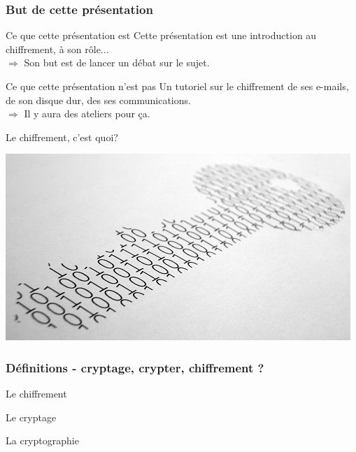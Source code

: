 \documentclass{beamer}
\begin{document}

\begin{frame}
\frametitle{But de cette présentation}

\begin{block}{Ce que cette présentation est}
Cette présentation est une introduction au chiffrement, à son rôle...
\\$\Rightarrow$ Son but est de lancer un débat sur le sujet.
\end{block}

\begin{block}{Ce que cette présentation n'est pas}
Un tutoriel sur le chiffrement de ses e-mails, de son disque dur, des ses communications.
\\$\Rightarrow$  Il y aura des ateliers pour ça.
\end{block}
\end{frame}

\begin{frame}
\Huge{\centerline{Le chiffrement, c'est quoi?}}

\begin{center}
\includegraphics[scale=0.4] {./Illustrations/cryptography.jpg} 
\end{center}
\end{frame}

\begin{frame}
\frametitle{Définitions - cryptage, crypter, chiffrement ?}

\begin{block}{Le chiffrement}
\end{block}
\begin{block}{Le cryptage}
\end{block}
\begin{block}{La cryptographie}
\end{block}
\end{frame}
\end{document}
